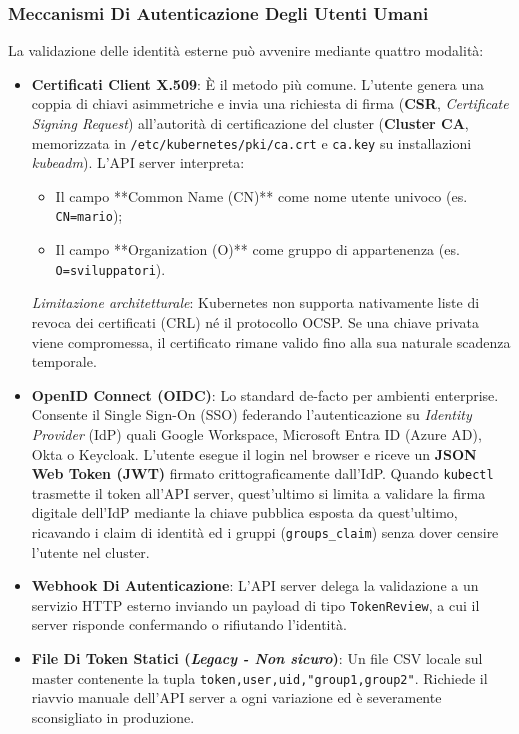 \documentclass[11pt, a4paper]{article}
\begin{document}
\subsubsection{Meccanismi Di Autenticazione Degli Utenti Umani}
La validazione delle identità esterne può avvenire mediante quattro modalità:
\begin{itemize}
    \item \textbf{Certificati Client X.509}: È il metodo più comune. L'utente genera una coppia di chiavi asimmetriche e invia una richiesta di firma (\textbf{CSR}, \emph{Certificate Signing Request}) all'autorità di certificazione del cluster (\textbf{Cluster CA}, memorizzata in \texttt{/etc/kubernetes/pki/ca.crt} e \texttt{ca.key} su installazioni \emph{kubeadm}). L'API server interpreta:
    \begin{itemize}[noitemsep]
        \item Il campo **Common Name (CN)** come nome utente univoco (es. \texttt{CN=mario});
        \item Il campo **Organization (O)** come gruppo di appartenenza (es. \texttt{O=sviluppatori}).
    \end{itemize}
    \emph{Limitazione architetturale}: Kubernetes non supporta nativamente liste di revoca dei certificati (CRL) né il protocollo OCSP. Se una chiave privata viene compromessa, il certificato rimane valido fino alla sua naturale scadenza temporale.
    \item \textbf{OpenID Connect (OIDC)}: Lo standard de-facto per ambienti enterprise. Consente il Single Sign-On (SSO) federando l'autenticazione su \emph{Identity Provider} (IdP) quali Google Workspace, Microsoft Entra ID (Azure AD), Okta o Keycloak. L'utente esegue il login nel browser e riceve un \textbf{JSON Web Token (JWT)} firmato crittograficamente dall'IdP. Quando \texttt{kubectl} trasmette il token all'API server, quest'ultimo si limita a validare la firma digitale dell'IdP mediante la chiave pubblica esposta da quest'ultimo, ricavando i claim di identità ed i gruppi (\texttt{groups\_claim}) senza dover censire l'utente nel cluster.
    \item \textbf{Webhook Di Autenticazione}: L'API server delega la validazione a un servizio HTTP esterno inviando un payload di tipo \texttt{TokenReview}, a cui il server risponde confermando o rifiutando l'identità.
    \item \textbf{File Di Token Statici (\emph{Legacy - Non sicuro})}: Un file CSV locale sul master contenente la tupla \texttt{token,user,uid,"group1,group2"}. Richiede il riavvio manuale dell'API server a ogni variazione ed è severamente sconsigliato in produzione.
\end{itemize}
\end{document}
